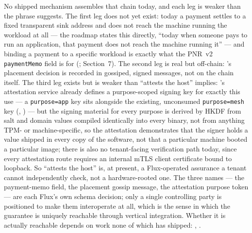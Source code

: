 No shipped mechanism assembles that chain today, and each leg is weaker than the phrase suggests.
The first leg does not yet exist: today a payment settles to a fixed transparent sink address and does
not reach the machine running the workload at all — the roadmap states this directly, ``today when
someone pays to run an application, that payment does not reach the machine running it''
 — and binding a payment to a specific workload is exactly
what the PNR~v2 \texttt{paymentMemo} field is for (\planned; Section~7). The second leg is real but
off-chain: \FluxOS's placement decision is recorded in gossiped, signed messages, not on the chain
itself. The third leg exists but is weaker than ``attests the host'' implies: \ArcaneOS's attestation
service already defines a purpose-scoped signing key for exactly this use — a \texttt{purpose=app}
key sits alongside the existing, unconsumed \texttt{purpose=\allowbreak{}mesh} key
(\shipped, ) — but the signing material for every purpose
is derived by HKDF from salt and domain values compiled identically into every binary, not from
anything TPM- or machine-specific, so the attestation demonstrates that the signer holds a value
shipped in every copy of the software, not that a particular machine booted a particular image; there
is also no tenant-facing verification path today, since every attestation route requires an internal
mTLS client certificate bound to loopback. So ``attests the host'' is, at present, a Flux-operated
assurance a tenant cannot independently check, not a hardware-rooted one. The three names — the
payment-memo field, the placement gossip message, the attestation purpose token — are each Flux's own
schema decision; only a single controlling party is positioned to make them interoperate at all, which
is the sense in which the guarantee is uniquely reachable through vertical integration. Whether it is
actually reachable depends on work none of which has shipped: \vision, \srcinferred.

